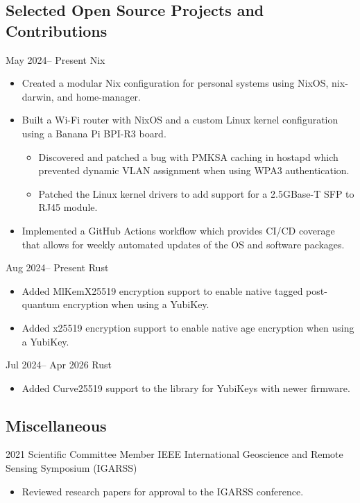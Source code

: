 \documentclass[10pt,legalpaper]{moderncv}
\begin{document}
\subsection{Selected Open Source Projects and Contributions}
\cventry
{May 2024-- Present  }
{}
{}
{Nix}
{}
{
    \begin{itemize}
        \item{Created a modular Nix configuration for personal systems using NixOS, nix-darwin, and home-manager.}
        \item{Built a Wi-Fi router with NixOS and a custom Linux kernel configuration using a Banana Pi BPI-R3 board.}
        \begin{itemize}
            \item{Discovered and patched a bug with PMKSA caching in hostapd which prevented dynamic VLAN assignment when using WPA3 authentication.}
            \item{Patched the Linux kernel drivers to add support for a 2.5GBase-T SFP to RJ45 module.}
        \end{itemize}
        \item{Implemented a GitHub Actions workflow which provides CI/CD coverage that allows for weekly automated updates of the OS and software packages.}
    \end{itemize}
}
\cventry
{Aug 2024-- Present  }
{}
{}
{Rust}
{}
{
    \begin{itemize}
        \item{Added MlKemX25519 encryption support to enable native tagged post-quantum encryption when using a YubiKey.}
        \item{Added x25519 encryption support to enable native age encryption when using a YubiKey.}
    \end{itemize}
}
\cventry
{Jul 2024-- Apr 2026  }
{}
{}
{Rust}
{}
{
    \begin{itemize}
        \item{Added Curve25519 support to the library for YubiKeys with newer firmware.}
    \end{itemize}
}

\subsection{Miscellaneous}
\cventry
{2021}
{Scientific Committee Member}
{IEEE International Geoscience and Remote Sensing Symposium (IGARSS)}
{}
{}
{
    \begin{itemize}
        \item{Reviewed research papers for approval to the IGARSS conference.}
    \end{itemize}
}
\end{document}
